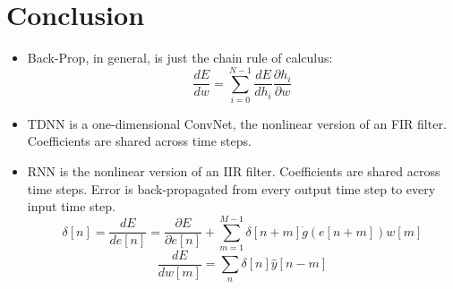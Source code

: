 \documentclass{beamer}
\begin{document}
\section{Conclusion}
\setcounter{subsection}{1}

\begin{frame}
  \begin{itemize}
  \item Back-Prop, in general, is just the chain rule of calculus:
    \begin{displaymath}
      \frac{dE}{dw} = \sum_{i=0}^{N-1}\frac{dE}{dh_i}\frac{\partial h_i}{\partial w}
    \end{displaymath}
  \item TDNN is a one-dimensional ConvNet, the nonlinear version of an FIR filter.
    Coefficients are shared across time steps.
  \item RNN is the nonlinear version of an IIR filter.  
    Coefficients are shared across time steps.
    Error is back-propagated from every output time step to every input time step.
    \begin{displaymath}
      \delta[n]=\frac{dE}{de[n]}=\frac{\partial E}{\partial e[n]}+
      \sum_{m=1}^{M-1}\delta[n+m]\dot{g}(e[n+m])w[m]
    \end{displaymath}
    \[
    \frac{dE}{dw[m]} = \sum_n \delta[n] \hat{y}[n-m]
    \]
  \end{itemize}
\end{frame}
\end{document}
